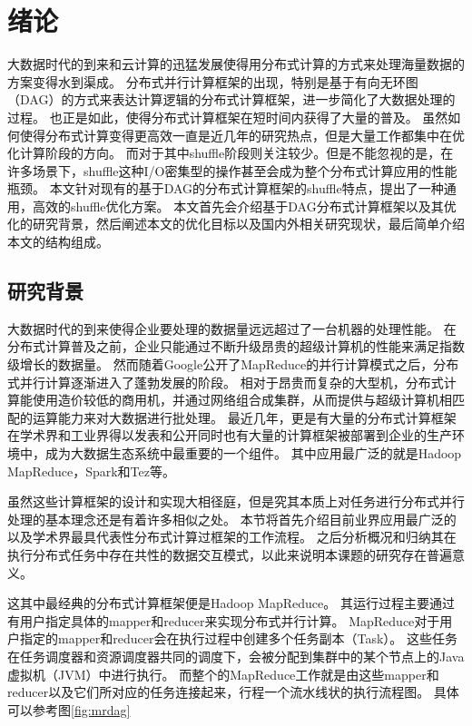 
\chapter{绪论}
\label{chap:intro}

大数据时代的到来和云计算的迅猛发展使得用分布式计算的方式来处理海量数据的方案变得水到渠成。
分布式并行计算框架的出现，特别是基于有向无环图（DAG）的方式来表达计算逻辑的分布式计算框架，进一步简化了大数据处理的过程。
也正是如此，使得分布式计算框架在短时间内获得了大量的普及。
虽然如何使得分布式计算变得更高效一直是近几年的研究热点，但是大量工作都集中在优化计算阶段的方向。
而对于其中shuffle阶段则关注较少。但是不能忽视的是，在许多场景下，shuffle这种I/O密集型的操作甚至会成为整个分布式计算应用的性能瓶颈。
本文针对现有的基于DAG的分布式计算框架的shuffle特点，提出了一种通用，高效的shuffle优化方案。
本文首先会介绍基于DAG分布式计算框架以及其优化的研究背景，然后阐述本文的优化目标以及国内外相关研究现状，最后简单介绍本文的结构组成。

\section{研究背景}

大数据时代的到来使得企业要处理的数据量远远超过了一台机器的处理性能。
在分布式计算普及之前，企业只能通过不断升级昂贵的超级计算机的性能来满足指数级增长的数据量。
然而随着Google公开了MapReduce\cite{mapreduce}的并行计算模式之后，分布式并行计算逐渐进入了蓬勃发展的阶段。
相对于昂贵而复杂的大型机，分布式计算能使用造价较低的商用机，并通过网络组合成集群，从而提供与超级计算机相匹配的运算能力来对大数据进行批处理。
最近几年，更是有大量的分布式计算框架在学术界和工业界得以发表和公开同时也有大量的计算框架被部署到企业的生产环境中，成为大数据生态系统中最重要的一个组件。
其中应用最广泛的就是Hadoop MapReduce\cite{mapreduce}，Spark\cite{apachespark}和Tez\cite{tez}等。

虽然这些计算框架的设计和实现大相径庭，但是究其本质上对任务进行分布式并行处理的基本理念还是有着许多相似之处。
本节将首先介绍目前业界应用最广泛的以及学术界最具代表性分布式计算过框架的工作流程。
之后分析概况和归纳其在执行分布式任务中存在共性的数据交互模式，以此来说明本课题的研究存在普遍意义。

这其中最经典的分布式计算框架便是Hadoop MapReduce\cite{hadoop}。
其运行过程主要通过有用户指定具体的mapper和reducer来实现分布式并行计算。
MapReduce对于用户指定的mapper和reducer会在执行过程中创建多个任务副本（Task）。
这些任务在任务调度器和资源调度器共同的调度下，会被分配到集群中的某个节点上的Java虚拟机（JVM）中进行执行。
而整个的MapReduce工作就是由这些mapper和reducer以及它们所对应的任务连接起来，行程一个流水线状的执行流程图。
具体可以参考图\ref{fig:mrdag}

